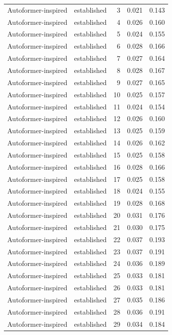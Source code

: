 \begin{tabular}{llrrr}
Autoformer-inspired & established & 3 & 0.021 & 0.143 \\
Autoformer-inspired & established & 4 & 0.026 & 0.160 \\
Autoformer-inspired & established & 5 & 0.024 & 0.155 \\
Autoformer-inspired & established & 6 & 0.028 & 0.166 \\
Autoformer-inspired & established & 7 & 0.027 & 0.164 \\
Autoformer-inspired & established & 8 & 0.028 & 0.167 \\
Autoformer-inspired & established & 9 & 0.027 & 0.165 \\
Autoformer-inspired & established & 10 & 0.025 & 0.157 \\
Autoformer-inspired & established & 11 & 0.024 & 0.154 \\
Autoformer-inspired & established & 12 & 0.026 & 0.160 \\
Autoformer-inspired & established & 13 & 0.025 & 0.159 \\
Autoformer-inspired & established & 14 & 0.026 & 0.162 \\
Autoformer-inspired & established & 15 & 0.025 & 0.158 \\
Autoformer-inspired & established & 16 & 0.028 & 0.166 \\
Autoformer-inspired & established & 17 & 0.025 & 0.158 \\
Autoformer-inspired & established & 18 & 0.024 & 0.155 \\
Autoformer-inspired & established & 19 & 0.028 & 0.168 \\
Autoformer-inspired & established & 20 & 0.031 & 0.176 \\
Autoformer-inspired & established & 21 & 0.030 & 0.175 \\
Autoformer-inspired & established & 22 & 0.037 & 0.193 \\
Autoformer-inspired & established & 23 & 0.037 & 0.191 \\
Autoformer-inspired & established & 24 & 0.036 & 0.189 \\
Autoformer-inspired & established & 25 & 0.033 & 0.181 \\
Autoformer-inspired & established & 26 & 0.033 & 0.181 \\
Autoformer-inspired & established & 27 & 0.035 & 0.186 \\
Autoformer-inspired & established & 28 & 0.036 & 0.191 \\
Autoformer-inspired & established & 29 & 0.034 & 0.184 \\

\end{tabular}
